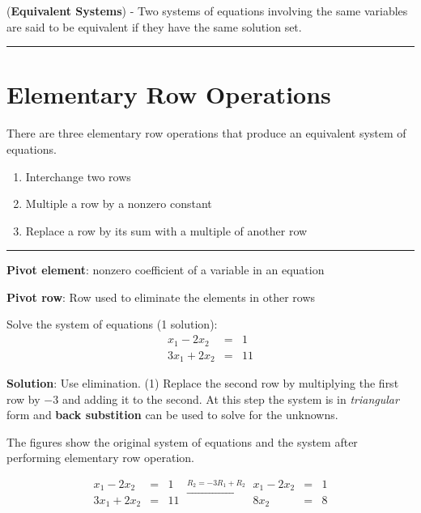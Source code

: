  \begin{tcolorbox}[colback=yellow!10!,colframe=gray!15!]

\begin{definition} (\textbf{Equivalent Systems}) -  Two systems of equations involving the same variables are said to be equivalent if they have the same solution set.  \end{definition}
 \end{tcolorbox} 


\rule[0.01in]{\textwidth}{0.0025in}




\section{Elementary Row Operations} 

There are three elementary row operations that produce  an equivalent system of equations.  


\begin{enumerate}
	\item Interchange two rows
	\item Multiple a row by a nonzero constant
	\item Replace a row by its sum with a multiple of another row
\end{enumerate}

\rule[0.01in]{\textwidth}{0.0025in}


\textbf{Pivot element}: nonzero coefficient of a variable in an equation %

\textbf{Pivot row}:  Row used to eliminate the elements in other rows %


%
%




\begin{example} Solve the system of equations (1 solution):
\[
\begin{array}{rcl} x_1 - 2x_2 & = & 1 \\ 3x_1 +2 x_2 & = &11 \end{array} 
\]

\textbf{Solution}: Use elimination.  (1) Replace the second row by multiplying the first row by $-3$ and adding it to the second.  At this step the system is in \textit{triangular} form and \textbf{back substition} can be used to solve for the unknowns.  

The figures show the original system of equations and the system after performing elementary row operation.  

\[  \begin{array}{rcl} x_1 - 2x_2 & = & 1 \\ 3x_1 +2 x_2 & = &11 \end{array}    \xrightarrow[]{R_2 = -3R_1 + R_2}   \begin{array}{rcl} x_1 - 2x_2 & = & 1 \\  8 x_2 & = & 8 \end{array}   \] 
\end{example}


